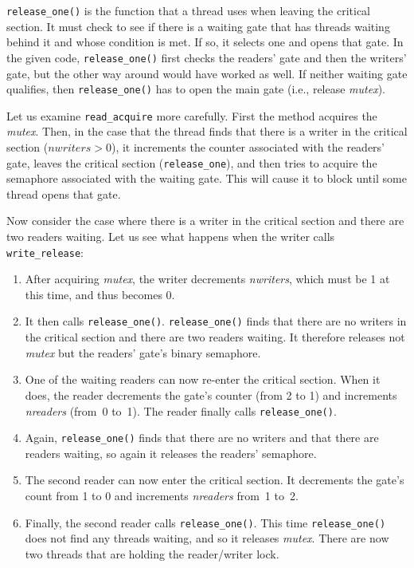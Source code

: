 \documentclass{report}
\begin{document}
\texttt{release\_one()} is the function that a thread uses when leaving
the critical section.  It must check to see if there is a waiting gate
that has threads waiting behind it and whose condition is met.
If so, it selects one and opens that gate.  In the given code,
\texttt{release\_one()} first checks the readers' gate and then the
writers' gate, but the other way around would have worked as well.
If neither waiting gate qualifies, then \texttt{release\_one()} 
has to open the main gate (i.e., release \textit{mutex}).

Let us examine \texttt{read\_acquire} more carefully.
First the method acquires the \textit{mutex}.
Then, in the case that the thread
finds that there is a writer in the critical section
($\mathit{nwriters > 0}$), it increments the counter associated with
the readers' gate, leaves the critical section (\texttt{release\_one}),
and then tries to acquire the semaphore associated with the waiting gate.
This will cause it to block until some thread opens that gate.

Now consider the case where there is a writer in the critical
section and there are two readers waiting.  Let us see what happens when
the writer calls \texttt{write\_release}:
\begin{enumerate}
\item After acquiring \textit{mutex}, the writer decrements
\textit{nwriters}, which must be 1 at this time, and thus becomes 0.
\item It then calls \texttt{release\_one()}.
\texttt{release\_one()} finds that there are no writers in the critical section
and there are two readers waiting.  It therefore releases not
\textit{mutex} but the readers' gate's binary semaphore.
\item One of the waiting readers can now re-enter the critical section.
When it does, the reader decrements the gate's counter (from 2 to 1)
and increments \textit{nreaders} (from~0 to~1).
The reader finally calls \texttt{release\_one()}.
\item Again, \texttt{release\_one()} finds that there are no writers and
that there are readers waiting, so again it releases the readers' semaphore.
\item The second reader can now enter the critical section.
It decrements the gate's count from 1 to 0 and increments \textit{nreaders}
from~1 to~2.
\item Finally, the second reader  calls \texttt{release\_one()}.
This time \texttt{release\_one()} does not find any threads waiting,
and so it releases \textit{mutex}.
There are now two threads that are holding the reader/writer lock.
\end{enumerate}
\end{document}
